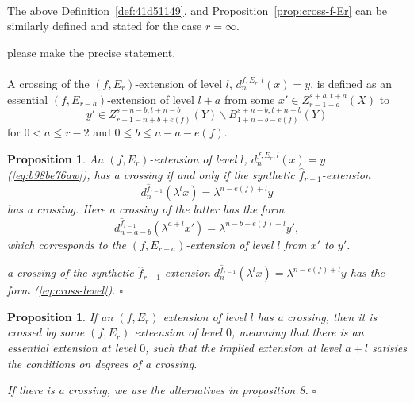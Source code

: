 \documentclass[12pt,a4paper]{article}
\renewenvironment{proof}{{\noindent\it\textbf{Proof}}\quad\it}{\hfill$\square$}
\newtheorem{prop}[equation]{Proposition}
\newtheorem{proposition}[equation]{Proposition}
\begin{document}
\begin{sloppy}
\paragraph{}
The above Definition~\ref{def:41d51149}, and Proposition~\ref{prop:cross-f-Er} can be similarly defined and stated for the case $r=\infty$.

please make the precise statement.

\paragraph{}
A crossing of the $(f,E_r)$-extension of level $l$, $d_{n}^{f,E_r,l}(x)=y$, is defined as an essential $(f, E_{r-a})$-extension of level $l+a$ from some $x'\in Z_{r-1-a}^{s+a,t+a}(X)$ to
$$y'\in Z_{r-1-n+b+e(f)}^{s+n-b,t+n-b}(Y)\backslash B_{1+n-b-e(f)}^{s+n-b,t+n-b}(Y)$$
for $0<a \le r-2$ and $0\le b\le n-a-e(f)$.

\begin{proposition}\label{prop:cross-f-Er-level}
    An $(f,E_r)$-extension of level $l$, $d_{n}^{f,E_r,l}(x)=y$ (\ref{eq:b98be76aw}), has a crossing if and only if the synthetic $\hat f_{r-1}$-extension
    $$d_{n}^{\hat f_{r-1}}(\lambda^l x)=\lambda^{n-e(f)+l} y$$
    has a crossing. Here a crossing of the latter has the form
    \begin{equation}\label{eq:cross-level}
        d_{n-a-b}^{\hat f_{r-1}}(\lambda^{a+l} x')=\lambda^{n-b-e(f)+l} y',
    \end{equation}
    which corresponds to the $(f,E_{r-a})$-extension of level $l$ from $x'$ to $y'$.
\end{proposition}

\begin{proof}
   a crossing of the synthetic $\hat f_{r-1}$-extension $d_n^{\hat f_{r-1}}(\lambda^l x)=\lambda^{n-e(f)+l}y$ has the form (\ref{eq:cross-level}).
\end{proof}

\begin{prop}
If an $(f,E_r)$ extension of level $l$ has a crossing, then it is crossed by some $(f,E_r)$ exteension of level $0$, meanning that there is an essential extension at level $0$, such that the implied extension at level $a+l$ satisies the conditions on degrees of a crossing.
\end{prop}
\begin{proof}
    If there is a crossing, we use the alternatives in proposition 8.
\end{proof}


\end{sloppy}
\end{document}
